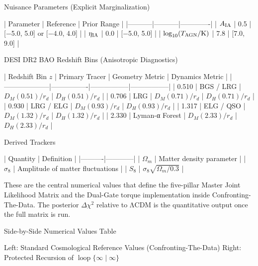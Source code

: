 Nuisance Parameters (Explicit Marginalization)

| Parameter | Reference | Prior Range |
|-----------|-----------|-------------|
| \(A_{\rm IA}\) | 0.5 | [−5.0, 5.0] or [−4.0, 4.0] |
| \(\eta_{\rm IA}\) | 0.0 | [−5.0, 5.0] |
| \(\log_{10}(T_{\rm AGN}/{\rm K})\) | 7.8 | [7.0, 9.0] |

DESI DR2 BAO Redshift Bins (Anisotropic Diagnostics)

| Redshift Bin \(z\) | Primary Tracer | Geometry Metric | Dynamics Metric |
|--------------------|----------------|-----------------|-----------------|
| 0.510 | BGS / LRG | \(D_M(0.51)/r_d\) | \(D_H(0.51)/r_d\) |
| 0.706 | LRG | \(D_M(0.71)/r_d\) | \(D_H(0.71)/r_d\) |
| 0.930 | LRG / ELG | \(D_M(0.93)/r_d\) | \(D_H(0.93)/r_d\) |
| 1.317 | ELG / QSO | \(D_M(1.32)/r_d\) | \(D_H(1.32)/r_d\) |
| 2.330 | Lyman-α Forest | \(D_M(2.33)/r_d\) | \(D_H(2.33)/r_d\) |

Derived Trackers

| Quantity | Definition |
|----------|------------|
| \(\Omega_m\) | Matter density parameter |
| \(\sigma_8\) | Amplitude of matter fluctuations |
| \(S_8\) | \(\sigma_8 \sqrt{\Omega_m / 0.3}\) |

These are the central numerical values that define the five-pillar Master Joint Likelihood Matrix and the Dual-Gate torque implementation inside Confronting-The-Data. The posterior \(\Delta\chi^2\) relative to ΛCDM is the quantitative output once the full matrix is run.

Side-by-Side Numerical Values Table

Left: Standard Cosmological Reference Values (Confronting-The-Data)  
Right: Protected Recursion of \(\operatorname{loop}\{\infty\mid\infty\}\)

